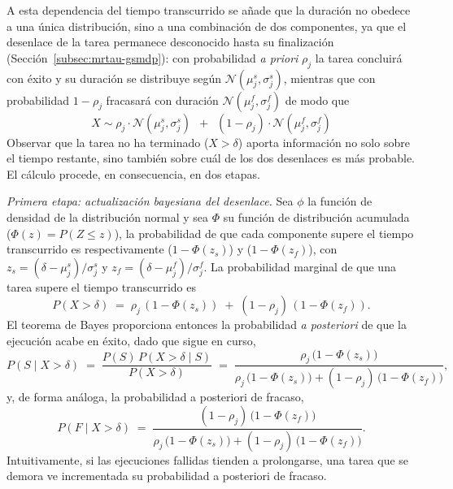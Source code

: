 A esta dependencia del tiempo transcurrido se añade que la duración no obedece a una única distribución, sino a una combinación de dos componentes, ya que el desenlace de la tarea permanece desconocido hasta su finalización (Sección~\ref{subsec:mrtau-gsmdp}): con probabilidad \textit{a priori} $\rho_j$ la tarea concluirá con éxito y su duración se distribuye según $\mathcal{N}(\mu_j^{s},\sigma_j^{s})$, mientras que con probabilidad $1-\rho_j$ fracasará con duración $\mathcal{N}(\mu_j^{f},\sigma_j^{f})$ de modo que
\begin{equation}
    X \sim \rho_j \cdot  \mathcal{N}(\mu_j^{s},\sigma_j^{s}) \;\ + \;\ (1-\rho_j) \cdot  \mathcal{N}(\mu_j^{f},\sigma_j^{f})
\end{equation}
Observar que la tarea no ha terminado ($X>\delta$) aporta información no solo sobre el tiempo restante, sino también sobre cuál de los dos desenlaces es más probable. El cálculo procede, en consecuencia, en dos etapas.
 
\emph{Primera etapa: actualización bayesiana del desenlace.} Sea $\phi$ la función de densidad de la distribución normal y sea $\Phi$ su función de distribución acumulada ($\Phi(z) = P(Z \le z)$), la probabilidad de que cada componente supere el tiempo transcurrido es respectivamente ($1-\Phi(z_s)$) y ($1-\Phi(z_f)$), con $z_s=(\delta-\mu_j^{s})/\sigma_j^{s}$ y $z_f=(\delta-\mu_j^{f})/\sigma_j^{f}$. La probabilidad marginal de que una tarea supere el tiempo transcurrido es
\begin{equation} \label{eq:surv-marginal}
    P(X>\delta) \;=\; \rho_j\,(1-\Phi(z_s)) \;+\; (1-\rho_j)\, (1-\Phi(z_f)).
\end{equation}
El teorema de Bayes proporciona entonces la probabilidad \emph{a posteriori} de que la ejecución acabe en éxito, dado que sigue en curso,
\begin{equation} \label{eq:posterior-success}
    P(S\mid X>\delta) \;=\; \frac{P(S)\,P(X>\delta\mid S)}{P(X>\delta)}
    \;=\; \frac{\rho_j\,\bigl(1-\Phi(z_s)\bigr)}{\rho_j\,\bigl(1-\Phi(z_s)\bigr) + (1-\rho_j)\,\bigl(1-\Phi(z_f)\bigr)},
\end{equation}
y, de forma análoga, la probabilidad a posteriori de fracaso,
\begin{equation} \label{eq:posterior-fail}
    P(F\mid X>\delta) \;=\; \frac{(1-\rho_j)\,\bigl(1-\Phi(z_f)\bigr)}{\rho_j\,\bigl(1-\Phi(z_s)\bigr) + (1-\rho_j)\,\bigl(1-\Phi(z_f)\bigr)}.
\end{equation}
Intuitivamente, si las ejecuciones fallidas tienden a prolongarse, una tarea que se demora ve incrementada su probabilidad a posteriori de fracaso.
 
